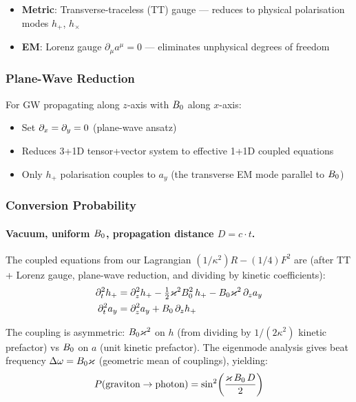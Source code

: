 \begin{itemize}
  \item \textbf{Metric}: Transverse-traceless (TT) gauge --- reduces to physical polarisation modes $h_+$, $h_\times$
  \item \textbf{EM}: Lorenz gauge $\partial_\mu a^\mu = 0$ --- eliminates unphysical degrees of freedom
\end{itemize}

\subsubsection{Plane-Wave Reduction}
\label{subsec:plane-wave-reduction}

For GW propagating along $z$-axis with $B_0$ along $x$-axis:
\begin{itemize}
  \item Set $\partial_x = \partial_y = 0$ (plane-wave ansatz)
  \item Reduces 3+1D tensor+vector system to effective 1+1D coupled equations
  \item Only $h_+$ polarisation couples to $a_y$ (the transverse EM mode parallel to $B_0$)
\end{itemize}

\subsubsection{Conversion Probability}
\label{subsec:conversion-probability}

\paragraph{Vacuum, uniform $B_0$, propagation distance $D = c \cdot t$.}
\label{par:vacuum-conversion}

The coupled equations from our Lagrangian $(1/\kappa^2)R - (1/4)F^2$ are (after TT + Lorenz gauge, plane-wave reduction, and dividing by kinetic coefficients):
\begin{align}
  \partial_t^2 h_+ &= \partial_z^2 h_+ - \tfrac{1}{2}\varkappa^2 B_0^2\, h_+ - B_0 \varkappa^2\, \partial_z a_y \label{eq:gert-eom-h} \\
  \partial_t^2 a_y &= \partial_z^2 a_y + B_0\, \partial_z h_+ \label{eq:gert-eom-a}
\end{align}

The coupling is asymmetric: $B_0\varkappa^2$ on $h$ (from dividing by $1/(2\kappa^2)$ kinetic prefactor) vs $B_0$ on $a$ (unit kinetic prefactor). The eigenmode analysis gives beat frequency $\Delta\omega = B_0\varkappa$ (geometric mean of couplings), yielding:
\begin{equation}
  P(\text{graviton} \to \text{photon}) = \sin^2\!\left(\frac{\varkappa\,B_0\, D}{2}\right)
  \label{eq:gert-P-vacuum}
\end{equation}

